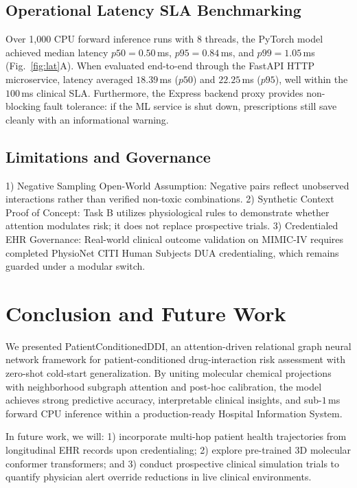 \documentclass[conference]{IEEEtran}
\begin{document}
\subsection{Operational Latency SLA Benchmarking}
Over 1,000 CPU forward inference runs with 8 threads, the PyTorch model achieved median latency $p50 = 0.50$\,ms, $p95 = 0.84$\,ms, and $p99 = 1.05$\,ms (Fig.~\ref{fig:lat}A). When evaluated end-to-end through the FastAPI HTTP microservice, latency averaged $18.39$\,ms ($p50$) and $22.25$\,ms ($p95$), well within the $100$\,ms clinical SLA. Furthermore, the Express backend proxy provides non-blocking fault tolerance: if the ML service is shut down, prescriptions still save cleanly with an informational warning.

\subsection{Limitations and Governance}
1) Negative Sampling Open-World Assumption: Negative pairs reflect unobserved interactions rather than verified non-toxic combinations.
2) Synthetic Context Proof of Concept: Task B utilizes physiological rules to demonstrate whether attention modulates risk; it does not replace prospective trials.
3) Credentialed EHR Governance: Real-world clinical outcome validation on MIMIC-IV requires completed PhysioNet CITI Human Subjects DUA credentialing, which remains guarded under a modular switch.

\section{Conclusion and Future Work}
We presented PatientConditionedDDI, an attention-driven relational graph neural network framework for patient-conditioned drug-interaction risk assessment with zero-shot cold-start generalization. By uniting molecular chemical projections with neighborhood subgraph attention and post-hoc calibration, the model achieves strong predictive accuracy, interpretable clinical insights, and sub-$1$\,ms forward CPU inference within a production-ready Hospital Information System.

In future work, we will: 1) incorporate multi-hop patient health trajectories from longitudinal EHR records upon credentialing; 2) explore pre-trained 3D molecular conformer transformers; and 3) conduct prospective clinical simulation trials to quantify physician alert override reductions in live clinical environments.
\end{document}
